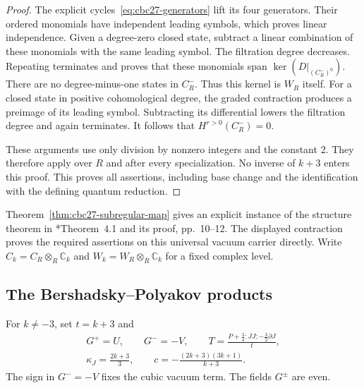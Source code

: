 \begin{proof}
The explicit cycles~\eqref{eq:cbc27-generators} lift its four generators.
Their ordered monomials have independent leading symbols, which proves linear independence.
Given a degree-zero closed state, subtract a linear combination of these monomials with the same leading symbol.
The filtration degree decreases.
Repeating terminates and proves that these monomials span $\ker(D|_{(C_R^-)^0})$.
There are no degree-minus-one states in $C_R^-$.
Thus this kernel is $W_R$ itself.
For a closed state in positive cohomological degree, the graded contraction produces a preimage of its leading symbol.
Subtracting its differential lowers the filtration degree and again terminates.
It follows that $H^{r>0}(C_R^-)=0$.

These arguments use only division by nonzero integers and the constant $2$.
They therefore apply over $R$ and after every specialization.
No inverse of $k+3$ enters this proof.
This proves all assertions, including base change and the identification with the defining quantum reduction.
\end{proof}

Theorem~\ref{thm:cbc27-subregular-map} gives an explicit instance of the structure theorem in
\cite{SubregularKW027}*{Theorem~4.1 and its proof, pp.~10--12}.
The displayed contraction proves the required assertions on this universal vacuum carrier directly.
Write $C_k=C_R\otimes_R\mathbb C_k$ and $W_k=W_R\otimes_R\mathbb C_k$ for a fixed complex level.

\subsection{The Bershadsky--Polyakov products}

For $k\ne-3$, set $t=k+3$ and
\begin{equation}\label{eq:cbc27-bp-fields}
 \begin{gathered}
 G^+=U,\qquad G^-=-V,\qquad
 T=\frac{P+\tfrac34:JJ:-\tfrac32\partial J}{t},\\
 \kappa_J=\frac{2k+3}{3},\qquad
 c=-\frac{(2k+3)(3k+1)}{k+3}.
 \end{gathered}
\end{equation}
The sign in $G^-=-V$ fixes the cubic vacuum term.
The fields $G^\pm$ are even.

